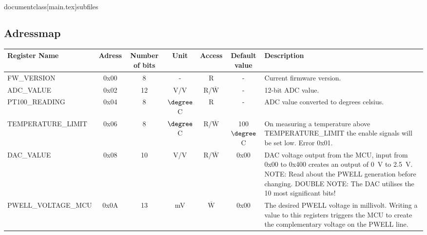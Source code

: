 \newpage
documentclass[main.tex]{subfiles}
\begingroup

\setlength{\arraycolsep}{10pt}
\setlength{\parindent}{10pt}
\fontsize{10pt}{10pt}
\selectfont

\begin{landscape}
    \subsection{Adressmap}
        \label{app:Adressmap}
\begin{center}
\setlength{\extrarowheight}{.115cm}
\begin{tabularx}{\linewidth}{l c c c c c X} %
    \toprule
    Register Name & Adress & Number of bits & Unit & Access & Default value & Description \\
    \bottomrule
    FW\_VERSION & 0x00 & 8 & - & R & - & Current firmware version. \vspace{\My_x} \\ 
    
    ADC\_VALUE & 0x02 & 12 & V/V & R/$\overline{\text{W}}$ & - & 12-bit ADC value. \vspace{\My_x} \\
    
    PT100\_READING & 0x04 & 8 & $\degree$C & R & - & ADC value converted to degrees celsius. \vspace{\My_x} \\
    
    TEMPERATURE\_LIMIT & 0x06 & 8 & $\degree$C & R/$\overline{\text{W}}$ & 100$\degree$C & On measuring a temperature above TEMPERATURE\_LIMIT the enable signals will be set low. Error 0x01. \vspace{\My_x} \\
    
    DAC\_VALUE & 0x08 & 10 & V/V & R/$\overline{\text{W}}$ & 0x00 & DAC voltage output from the MCU, input from 0x00 to 0x400 creates an output of \SI{0}{\V} to \SI{2.5}{\V}. NOTE: Read about the PWELL generation before changing. DOUBLE NOTE: The DAC utilises the 10 most significant bits! \vspace{\My_x} \\
    
    PWELL\_VOLTAGE\_MCU & 0x0A & 13 & mV & $\overline{\text{W}}$ & 0x00 & The desired PWELL voltage in millivolt. Writing a value to this registers triggers the MCU to create the complementary voltage on the PWELL line. \vspace{\My_x} \\
    

\end{tabularx}
\end{center}
\end{landscape}
